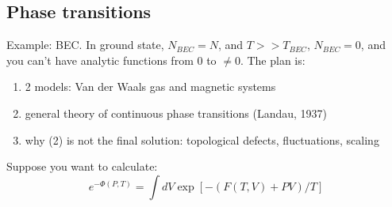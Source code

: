 \documentclass[12 pt]{article}
\begin{document}
\subsection*{Phase transitions}
Example: BEC. In ground state, $N_{BEC} = N$, and $T>>T_{BEC}$, $N_{BEC} = 0$, and you can't have analytic functions from $0$ to $\neq 0$. The plan is:
\begin{enumerate}
\item 2 models: Van der Waals gas and magnetic systems
\item general theory of continuous phase transitions (Landau, 1937)
\item why (2) is not the final solution: topological defects, fluctuations, scaling
\end{enumerate}
Suppose you want to calculate:
\[      e^{- \Phi(P,T)} = \int dV \exp [ - (F(T,V) + PV)/T ]     \]
\end{document}

